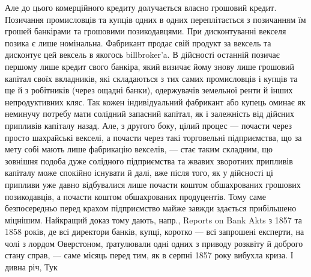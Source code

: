 Але до цього комерційного кредиту долучається власно грошовий кредит. Позичання
промисловців та купців одних в одних переплітається з позичанням їм
грошей банкірами та грошовими позикодавцями. При дисконтуванні векселя позика
є лише номінальна. Фабрикант продає свій продукт за вексель та дисконтує
цей вексель в якогось billbroker’a. В дійсності останній позичає першому
лише кредит свого банкіра, який визичає йому знову лише грошовий капітал
своїх вкладників, які складаються з тих самих промисловців і купців та ще й
з робітників (через ощадні банки), одержувачів земельної ренти й інших непродуктивних
кляс. Так кожен індивідуальний фабрикант або купець оминає як
неминучу потребу мати солідний запасний капітал, як і залежність від дійсних
припливів капіталу назад. Але, з другого боку, цілий процес — почасти через просто
шахрайські векселі, а почасти через такі торговельні підприємства, що за мету
собі мають лише фабрикацію векселів, — стає таким складним, що зовнішня подоба
дуже солідного підприємства та жвавих зворотних припливів капіталу може
спокійно існувати й далі, вже після того, як у дійсності ці припливи уже давно
відбувалися лише почасти коштом обшахрованих грошових позикодавців, а почасти
коштом обшахрованих продуцентів. Тому саме безпосередньо перед крахом
підприємство майже завжди здається прибільшено міцнішим. Найкращий
доказ тому дають, напр., Reports on Bank Akts з 1857 та 1858 років, де всі
директори банків, купці, коротко — всі запрошені експерти, на чолі з лордом
Оверстоном, ґратулювали одні одних з приводу розквіту й доброго стану справ, —
саме місяць перед тим, як в серпні 1857 року вибухла криза. І дивна річ, Тук
\parbreak{}  %
